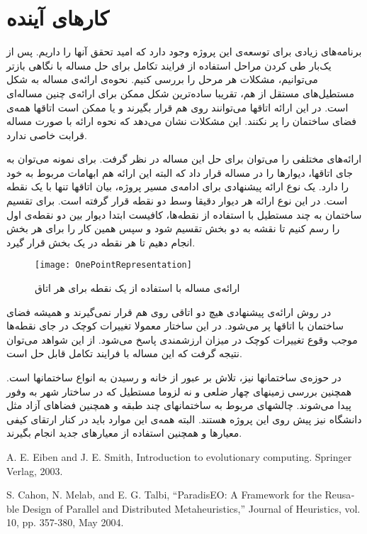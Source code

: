 \documentclass{report}
\begin{document}
\section{کارهای آینده}
برنامه‌های زیادی برای توسعه‌ی این پروژه وجود دارد که امید تحقق آنها را داریم. پس از یک‌بار طی کردن مراحل استفاده از فرایند تکامل برای حل مساله با نگاهی بازتر می‌توانیم، مشکلات هر مرحل را بررسی کنیم. نحوه‌ی ارائه‌ی مساله به شکل مستطیل‌های مستقل از هم، تقریبا ساده‌ترین شکل ممکن برای ارائه‌ی چنین مساله‌ای است. در این ارائه اتاقها می‌توانند روی هم قرار بگیرند و یا ممکن است اتاقها همه‌ی فضای ساختمان را پر نکنند. این مشکلات نشان می‌دهد که نحوه ارائه با صورت مساله قرابت خاصی ندارد.

ارائه‌های مختلفی را می‌توان برای حل این مساله در نظر گرفت. برای نمونه می‌توان به جای اتاقها، دیوارها را در مساله قرار داد که البته این ارائه هم ابهامات مربوط به خود را دارد. یک نوع ارائه پیشنهادی برای ادامه‌ی مسیر پروژه، بیان اتاقها تنها با یک نقطه است. در این نوع ارائه هر دیوار دقیقا وسط دو نقطه قرار گرفته است. برای تقسیم ساختمان به چند مستطیل با استفاده از نقطه‌ها، کافیست ابتدا دیوار بین دو نقطه‌ی اول را رسم کنیم تا نقشه به دو بخش تقسیم شود و سپس همین کار را برای هر بخش انجام دهیم تا هر نقطه در یک بخش قرار گیرد.

\begin{figure} \centerline{\texttt{[image: OnePointRepresentation]}} \caption{\label{fOnePointRepresentation}
ارائه‌ی مساله با استفاده از یک نقطه برای هر اتاق
} \end{figure}

در روش ارائه‌ی پیشنهادی هیچ دو اتاقی روی هم قرار نمی‌گیرند و همیشه فضای ساختمان با اتاقها پر می‌شود. در این ساختار معمولا تغییرات کوچک در جای نقطه‌ها موجب وقوع تغییرات کوچک در میزان ارزشمندی پاسخ می‌شود. از این شواهد می‌توان نتیجه گرفت که این مساله با فرایند تکامل قابل حل است.

در حوزه‌ی ساختمانها نیز، تلاش بر عبور از خانه و رسیدن به انواع ساختمانها است. همچنین بررسی زمینهای چهار ضلعی و نه لزوما مستطیل که در ساختار شهر به وفور پیدا می‌شوند. چالشهای مربوط به ساختمانهای چند طبقه و همچنین فضاهای آزاد مثل دانشگاه نیز پیش روی این پروژه هستند. البته همه‌ی این موارد باید در کنار ارتقای کیفی معیارها و همچنین استفاده از معیارهای جدید انجام بگیرند.

\renewcommand*{\refname}{\section{منابع}}
\begin{thebibliography}{9}
\begin{latin}

A. E. Eiben and J. E. Smith, Introduction to evolutionary computing. Springer Verlag, 2003.

S. Cahon, N. Melab, and E. G. Talbi, “ParadisEO: A Framework for the Reusable Design of Parallel and Distributed Metaheuristics,” Journal of Heuristics, vol. 10, pp. 357-380, May 2004.

\end{latin}
\end{thebibliography}
\end{document}
